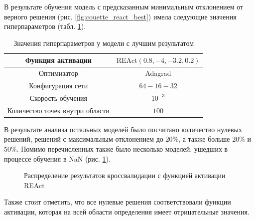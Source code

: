 В результате обучения модель с предсказанным минимальным отклонением от
верного решения (рис. \ref{fig:couette_react_best}) имела следующие значения
гиперпараметров (табл. \ref{table:couette_react_best_params}).

\begin{table}[h!]
    \centering
    \begin{tabular}{ |c|c| } 
        \hline
        Функция активации & $\text{REAct}(0.8, -4, -3.2, 0.2)$ \\
        \hline
        Оптимизатор & Adagrad \\ 
        \hline
        Конфигурация сети & $64-16-32$ \\ 
        \hline
        Скорость обучения & $10^{-3}$ \\ 
        \hline
        Количество точек внутри области & $100$ \\ 
        \hline
    \end{tabular}
    \caption{Значения гиперпараметров у модели с лучшим результатом}
    \label{table:couette_react_best_params}
\end{table}

В результате анализа остальных моделей было посчитано количество нулевых
решений, решений с максимальным отклонением до 20\%, а также больше 20\% и 50\%.
Помимо перечисленных также было несколько моделей, ушедших в процессе обучения в
NaN (рис. \ref{fig:couette_react_stat}). 

\begin{figure}[ht]
    \centering
    \caption{Распределение результатов кроссвалидации с функцией активации REAct}
    \label{fig:couette_react_stat}
\end{figure}

Также стоит отметить, что все нулевые решения соответствовали функции активации,
которая на всей области определения имеет отрицательные значения.

